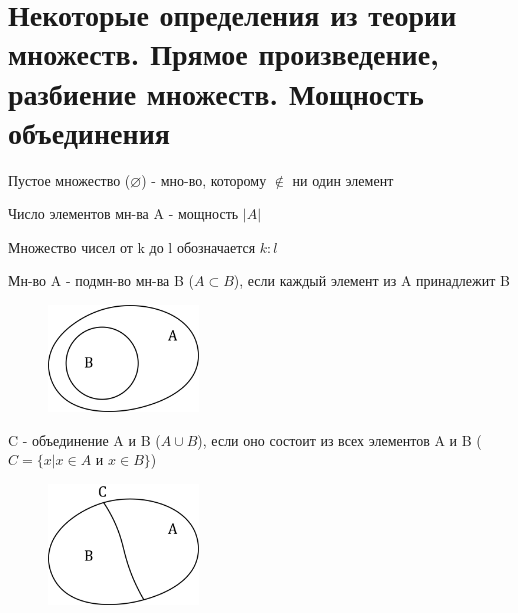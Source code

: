 \documentclass[discrete.tex]{subfiles}
\begin{document}
\section{Некоторые определения из теории множеств. Прямое произведение, разбиение множеств. Мощность объединения}
\begin{definition}
  Пустое множество ($\varnothing$) - мно-во, которому $\nin$ ни один элемент
\end{definition}

\begin{definition}
  Число элементов мн-ва A - мощность $|A|$
\end{definition}

\begin{definition}
  Множество чисел от k до l обозначается $k:l$
\end{definition}

\begin{definition}
  Мн-во A - подмн-во мн-ва B ($A \subset B$), если каждый элемент из A принадлежит B
  \begin{figure}[H]
      \includegraphics[width=4cm]{pics/1_1.png}
      \centering
  \end{figure}
\end{definition}

\begin{definition}
  C - объединение A и B ($A \cup B$), если оно состоит из всех элементов A и B ($C = \{x | x \in A \text{ и } x \in B\}$)
  \begin{figure}[H]
      \includegraphics[width=4cm]{pics/1_2.png}
      \centering
  \end{figure}
\end{definition}
\end{document}
